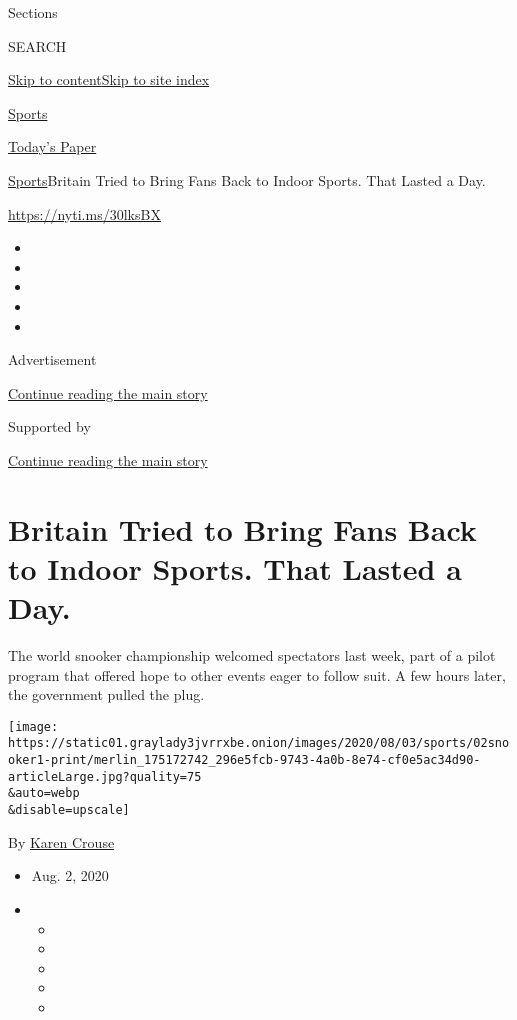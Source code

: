 Sections

SEARCH

\protect\hyperlink{site-content}{Skip to
content}\protect\hyperlink{site-index}{Skip to site index}

\href{https://www.nytimes3xbfgragh.onion/section/sports}{Sports}

\href{https://myaccount.nytimes3xbfgragh.onion/auth/login?response_type=cookie\&client_id=vi}{}

\href{https://www.nytimes3xbfgragh.onion/section/todayspaper}{Today's
Paper}

\href{/section/sports}{Sports}\textbar{}Britain Tried to Bring Fans Back
to Indoor Sports. That Lasted a Day.

\url{https://nyti.ms/30lksBX}

\begin{itemize}
\item
\item
\item
\item
\item
\end{itemize}

Advertisement

\protect\hyperlink{after-top}{Continue reading the main story}

Supported by

\protect\hyperlink{after-sponsor}{Continue reading the main story}

\hypertarget{britain-tried-to-bring-fans-back-to-indoor-sports-that-lasted-a-day}{%
\section{Britain Tried to Bring Fans Back to Indoor Sports. That Lasted
a
Day.}\label{britain-tried-to-bring-fans-back-to-indoor-sports-that-lasted-a-day}}

The world snooker championship welcomed spectators last week, part of a
pilot program that offered hope to other events eager to follow suit. A
few hours later, the government pulled the plug.

\texttt{[image: https://static01.graylady3jvrrxbe.onion/images/2020/08/03/sports/02snooker1-print/merlin\_175172742\_296e5fcb-9743-4a0b-8e74-cf0e5ac34d90-articleLarge.jpg?quality=75\\\&auto=webp\\\&disable=upscale]}

By \href{https://www.nytimes3xbfgragh.onion/by/karen-crouse}{Karen
Crouse}

\begin{itemize}
\item
  Aug. 2, 2020
\item
  \begin{itemize}
  \item
  \item
  \item
  \item
  \item
  \end{itemize}
\end{itemize}

